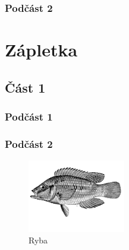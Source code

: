 \documentclass[12pt]{article} %
\begin{document}
\subsubsection{Podčást 2} %

\lipsum[4] %


\section{Zápletka} %

\lipsum[5] %


\subsection{Část 1} %

\subsubsection{Podčást 1} %

\lipsum[6] %


\subsubsection{Podčást 2} %

\lipsum[6] %
\begin{figure} %
  \begin{center}
    \includegraphics[width=0.38\textwidth]{fish}
  \end{center}
  \caption{Ryba}
\end{figure}
\lipsum[7-8] %
\end{document}
